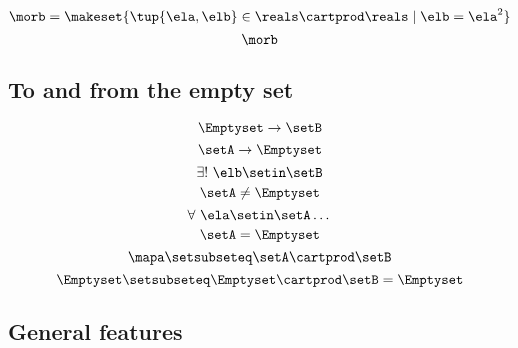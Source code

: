 \begin{forslides}
    \begin{equation}\label{eq:slides_session2_113a}
        \morb = \makeset{\tup{\ela, \elb} \in \reals \cartprod \reals \mid \elb = \ela^2}
    \end{equation}
    \begin{equation}\label{eq:slides_session2_113b}
        \morb
    \end{equation}

    \subsection{To and from the empty set}

    \begin{equation}\label{eq:slides_session2_114}
        \Emptyset \to \setB
    \end{equation}
    \begin{equation}\label{eq:slides_session2_115}
        \setA \to \Emptyset
    \end{equation}
    \begin{equation}\label{eq:slides_session2_116}
        \exists ! \ \elb \setin\setB
    \end{equation}
    \begin{equation}\label{eq:slides_session2_117}
        \setA \neq \Emptyset
    \end{equation}
    \begin{equation}\label{eq:slides_session2_118}
        \forall \ \ela \setin\setA \dots
    \end{equation}
    \begin{equation}\label{eq:slides_session2_119}
        \setA = \Emptyset
    \end{equation}
    \begin{equation}\label{eq:slides_session2_120}
        \mapa \setsubseteq \setA \cartprod \setB
    \end{equation}
    \begin{equation}\label{eq:slides_session2_121}
        \Emptyset \setsubseteq \Emptyset \cartprod \setB = \Emptyset
    \end{equation}

    \subsection{General features}


\end{forslides}
